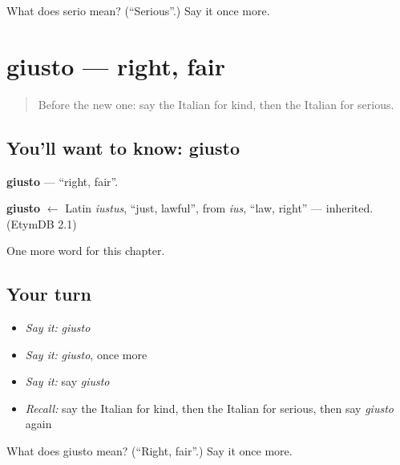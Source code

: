 \begin{tcolorbox}[breakable,colback=teal!4,colframe=teal!35!black,title={Before you move on}]
What does serio mean? (\textquotedblleft{}Serious\textquotedblright{}.) Say it once more.
\end{tcolorbox}
\section[giusto]{giusto — right, fair}

\label{lesson:IT-C127-giusto}



\begin{quote}
Before the new one: say the Italian for kind, then the Italian for serious.
\end{quote}

\subsection*{You'll want to know: giusto}
\textbf{giusto} — \textquotedblleft{}right, fair\textquotedblright{}.

\begin{cousinweb}
\textbf{giusto} $\leftarrow$ Latin \emph{iustus}, \textquotedblleft{}just, lawful\textquotedblright{}, from \emph{ius}, \textquotedblleft{}law, right\textquotedblright{} — inherited. (EtymDB 2.1)
\end{cousinweb}

\begin{grammarlens}[title={What you've built}]
One more word for this chapter.
\end{grammarlens}

\subsection*{Your turn}
\begin{itemize}
\raggedright
  \item \emph{Say it:} \emph{giusto}
  \item \emph{Say it:} \emph{giusto}, once more
  \item \emph{Say it:} say \emph{giusto}
  \item \emph{Recall:} say the Italian for kind, then the Italian for serious, then say \emph{giusto} again
\end{itemize}

\begin{tcolorbox}[breakable,colback=teal!4,colframe=teal!35!black,title={Before you move on}]
What does giusto mean? (\textquotedblleft{}Right, fair\textquotedblright{}.) Say it once more.
\end{tcolorbox}
